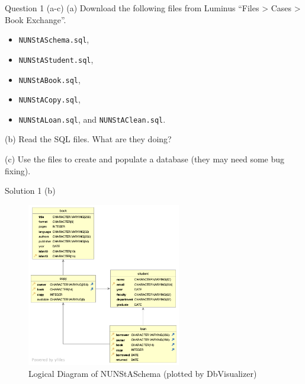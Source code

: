 \begin{frame}[fragile]{Question 1 (a-c)}
(a) Download the following files from Luminus ``Files > Cases > Book Exchange''.
\begin{itemize}
	\item[] \texttt{NUNStASchema.sql},
	\item[] \texttt{NUNStAStudent.sql},
	\item[] \texttt{NUNStABook.sql},
	\item[] \texttt{NUNStACopy.sql},
	\item[] \texttt{NUNStALoan.sql}, and \texttt{NUNStAClean.sql}.
\end{itemize}
\vspace{10pt}

(b) Read the SQL files. What are they doing? \vspace{10pt}

(c) Use the files to create and populate a database (they may need some bug fixing).
\end{frame}

\begin{frame}[fragile]{Solution 1 (b)}
\begin{figure}
\includegraphics[width=0.6\textwidth]{t1/images/t1-0.png}
\caption{Logical Diagram of NUNStASchema (plotted by DbVisualizer)}
\end{figure}
\end{frame}

